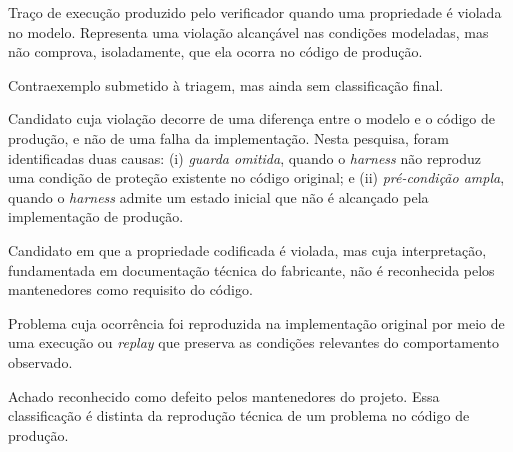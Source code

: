 \begin{tcolorbox}[colback=gray!4!white, colframe=gray!55!black,
boxrule=0.6pt, arc=2pt, left=8pt, right=8pt, top=6pt, bottom=6pt,
title={\textbf{Classificação dos achados}}]
\footnotesize
\begin{description}[leftmargin=3.0cm, style=nextline, font=\normalfont\bfseries]

\item[Contraexemplo] Traço de execução produzido pelo verificador quando uma propriedade é violada no modelo. Representa uma violação alcançável nas condições modeladas, mas não comprova, isoladamente, que ela ocorra no código de produção.

\item[Candidato] Contraexemplo submetido à triagem, mas ainda sem classificação final.

\item[Falso positivo de modelagem] Candidato cuja violação decorre de uma diferença entre o modelo e o código de produção, e não de uma falha da implementação. Nesta pesquisa, foram identificadas duas causas: (i) \emph{guarda omitida}, quando o \textit{harness} não reproduz uma condição de proteção existente no código original; e (ii) \emph{pré-condição ampla}, quando o \textit{harness} admite um estado inicial que não é alcançado pela implementação de produção.

\item[Especificação disputada] Candidato em que a propriedade codificada é violada, mas cuja interpretação, fundamentada em documentação técnica do fabricante, não é reconhecida pelos mantenedores como requisito do código.

\item[Defeito reproduzido no código de produção] Problema cuja ocorrência foi reproduzida na implementação original por meio de uma execução ou \textit{replay} que preserva as condições relevantes do comportamento observado.

\item[Defeito confirmado] Achado reconhecido como defeito pelos mantenedores do projeto. Essa classificação é distinta da reprodução técnica de um problema no código de produção.

\end{description}
\end{tcolorbox}

